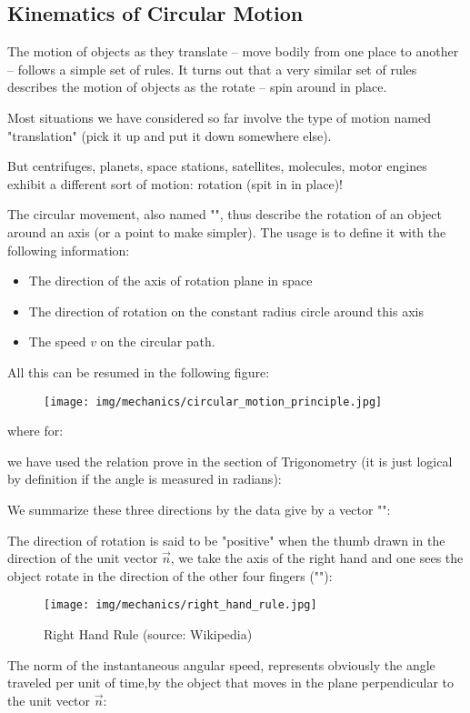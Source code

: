 	\subsection{Kinematics of Circular Motion}
	The motion of objects as they translate -- move bodily from one place to another -- follows a simple set of rules. It turns out that a very similar set of rules describes the motion of objects as the rotate -- spin around in place.

	Most situations we have considered so far involve the type of motion named "translation" (pick it up and put it down somewhere else).

	But centrifuges, planets, space stations, satellites, molecules, motor engines exhibit a different sort of motion: rotation (spit in in place)!

	The circular movement, also named "", thus describe the rotation of an object around an axis (or a point to make simpler). The usage is to define it with the following information:

	\begin{itemize}
		\item The direction of the axis of rotation plane in space

		\item The direction of rotation on the constant radius circle around this axis

		\item The speed $v$ on the circular path.
	\end{itemize}
	All this can be resumed in the following figure:
	\begin{figure}[H]
		\centering
		\texttt{[image: img/mechanics/circular\_motion\_principle.jpg]}
	\end{figure}
	where for:
	
	we have used the relation prove in the section of Trigonometry (it is just logical by definition if the angle is measured in radians):
	
	We summarize these three directions by the data give by a vector "":
	
	The direction of rotation is said to be "positive" when the thumb drawn in the direction of the unit vector $\vec{n}$, we take the axis of the right hand and one sees the object rotate in the direction of the other four fingers (""):
	\begin{figure}[H]
		\centering
		\texttt{[image: img/mechanics/right\_hand\_rule.jpg]}
		\caption{Right Hand Rule (source: Wikipedia)}
	\end{figure}
	The norm of the instantaneous angular speed, represents obviously the angle traveled per unit of time,by the object that moves in the plane perpendicular to the unit vector $\vec{n}$:
	
